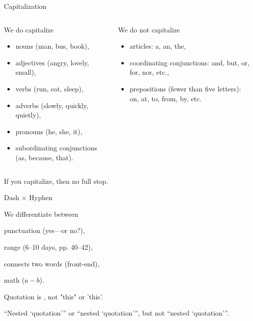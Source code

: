 \documentclass[xcolor=dvipsnames, aspectratio=169, handout, intlimits]{beamer}
\begin{document}
\begin{frame}[t]{Capitalization}

\vspace{-0.5cm}
\begin{columns}[t]
	\begin{column}{0.5\textwidth}	
		We \textcolor{elmagLight}{do} capitalize
		\begin{itemize}
			\item nouns (man, bus, book),
			\item adjectives (angry, lovely, small),
			\item verbs (run, eat, sleep),
			\item adverbs (slowly, quickly, quietly),
			\item pronouns (he, she, it),
			\item subordinating conjunctions (as, because, that).
		\end{itemize}
	\end{column}
	\begin{column}{0.5\textwidth}
		We \textcolor{elmagLight}{do not} capitalize	
		\begin{itemize}
			\item articles: a, an, the,
			\item coordinating conjunctions: and, but, or, for, nor, etc.,
			\item prepositions (fewer than five letters): on, at, to, from, by, etc.
		\end{itemize}
	\end{column}		
\end{columns}

If you capitalize, then no full stop.

\vspace{0.25cm}
\href{https://capitalizemytitle.com/}{}
\end{frame}

\begin{frame}{Dash $\times$ Hyphen}

\vspace{-0.5cm}
We differentiate between
\begin{description}
\item[em dash \Quot{---}] punctuation (yes---or no?),
\item[en dash \Quot{--}] range (6--10 days, pp. 40--42),
\item[hyphen \Quot{-}] connects two words (front-end),
\item[minus \Quot{$-$}] math ($a-b$).
\end{description}

\vspace{0.25cm}
Quotation is , not "this" or 'this'.

``Nested `quotation'{}'' or ``nested `quotation'\thinspace'', but not ``nested `quotation'''.

\end{frame}
\end{document}
